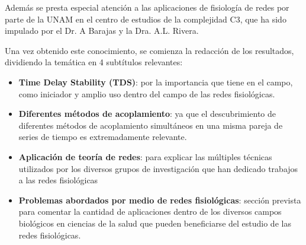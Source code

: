 \documentclass[twoside,twocolumn]{article}
\begin{document}
Además se presta especial atención a las aplicaciones de fisiología de redes por parte de la UNAM en el centro de estudios de la complejidad C3, que ha sido impulado por el Dr. A Barajas y la Dra. A.L. Rivera.

Una vez obtenido este conocimiento, se comienza la redacción de los resultados, dividiendo la temática en 4 subtítulos relevantes:
\begin{itemize}
  \item \textbf{Time Delay Stability (TDS)}: por la importancia que tiene en el campo, como iniciador y amplio uso dentro del campo de las redes fisiológicas.
  \item \textbf{Diferentes métodos de acoplamiento}: ya que el descubrimiento de diferentes métodos de acoplamiento simultáneos en una misma pareja de series de tiempo es extremadamente relevante.
  \item \textbf{Aplicación de teoría de redes}: para explicar las múltiples técnicas utilizados por los diversos grupos de investigación que han dedicado trabajos a las redes fisiológicas
  \item \textbf{Problemas abordados por medio de redes fisiológicas}: sección prevista para comentar la cantidad de aplicaciones dentro de los diversos campos biológicos en ciencias de la salud que pueden beneficiarse del estudio de las redes fisiológicas.
\end{itemize}

\end{document}
